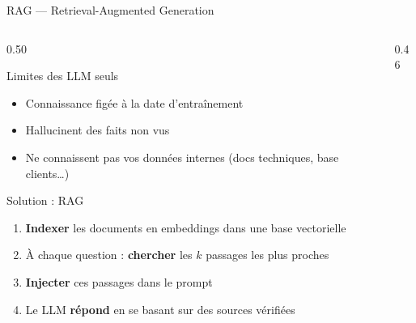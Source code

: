\documentclass[aspectratio=169, 10pt]{beamer}
\begin{document}
\begin{frame}{RAG --- Retrieval-Augmented Generation}
  \begin{columns}[T]
    \begin{column}{0.50\textwidth}
      \begin{alertblock}{Limites des LLM seuls}
        \begin{itemize}
          \item Connaissance figée à la date d'entraînement
          \item Hallucinent des faits non vus
          \item Ne connaissent pas vos données internes
                (docs techniques, base clients\ldots)
        \end{itemize}
      \end{alertblock}
      \smallskip
      \begin{exampleblock}{Solution : RAG}
        \begin{enumerate}
          \item \textbf{Indexer} les documents en embeddings
                dans une base vectorielle
          \item À chaque question : \textbf{chercher} les $k$
                passages les plus proches
          \item \textbf{Injecter} ces passages dans le prompt
          \item Le LLM \textbf{répond} en se basant sur
                des sources vérifiées
        \end{enumerate}
      \end{exampleblock}
    \end{column}
    \begin{column}{0.46\textwidth}
      \vspace{-4pt}
      \begin{center}
\end{center}
\end{column}
\end{columns}
\end{frame}
\end{document}
